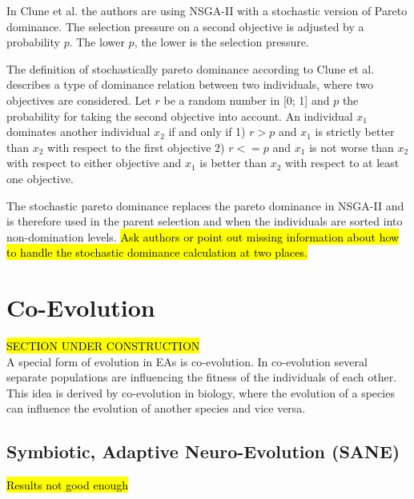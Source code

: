     In Clune et al.\cite{clune2013evolutionary} the authors are using NSGA-II with a stochastic version of Pareto dominance. The selection pressure on a second objective is adjusted by a probability $p$. The lower $p$, the lower is the selection pressure.
    
    The definition of stochastically pareto dominance according to Clune et al.\cite{clune2013evolutionary} describes a type of dominance relation between two individuals, where two objectives are considered. Let $r$ be a random number in [0; 1] and $p$ the probability for taking the second objective into account. An individual $x_1$ dominates another individual $x_2$ if and only if 1) $r>p$ and $x_1$ is strictly better than $x_2$ with respect to the first objective 2) $r<=p$ and $x_1$ is not worse than $x_2$ with respect to either objective and $x_1$ is better than $x_2$ with respect to at least one objective.
    
    The stochastic pareto dominance replaces the pareto dominance in NSGA-II and is therefore used in the parent selection and when the individuals are sorted into non-domination levels.
    \hl{Ask authors or point out missing information about how to handle the stochastic dominance calculation at two places.}
    
    \section{Co-Evolution}
    \hl{SECTION UNDER CONSTRUCTION}\\
    A special form of evolution in EAs is co-evolution. In co-evolution several separate populations are influencing the fitness of the individuals of each other. This idea is derived by co-evolution in biology, where the evolution of a species can influence the evolution of another species and vice versa.
    
    \subsection{Symbiotic, Adaptive Neuro-Evolution (SANE)}
    \hl{Results not good enough}